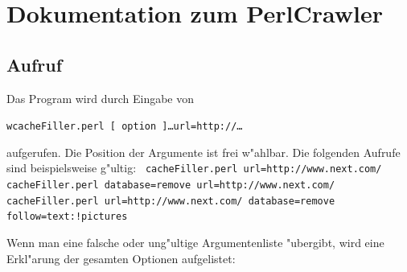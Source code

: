 \chapter{Dokumentation zum PerlCrawler}
\label{DokumentationPerlCrawler}

\section{Aufruf}

Das Program wird durch Eingabe von 
\begin{center}
{\tt \small wcacheFiller.perl [ option ]\dots url=http://\dots}
\end{center}
aufgerufen. Die Position der Argumente ist frei w"ahlbar. Die folgenden Aufrufe sind beispielsweise g"ultig:
\nl\nl
{\tt \small
	cacheFiller.perl url=http://www.next.com/						\nl
	cacheFiller.perl database=remove url=http://www.next.com/		\nl
	cacheFiller.perl url=http://www.next.com/ database=remove follow=text:!pictures	\nl
}

Wenn man eine falsche oder ung"ultige Argumentenliste "ubergibt, wird eine Erkl"arung der gesamten Optionen aufgelistet:

